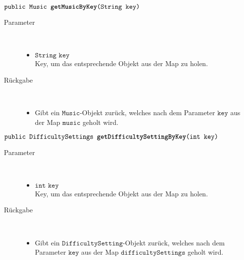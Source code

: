 \begin{description}
		\item $\texttt{public Music \textbf{getMusicByKey}(String key)}$ \\ 
		\begin{description}
			\item[Parameter] \hfill \\
			\vspace{-.8cm}
			\begin{itemize}
				\item $\texttt{String key}$ \\ Key, um das entsprechende Objekt aus der Map zu holen.
			\end{itemize}
			\item[Rückgabe] \hfill \\
			\vspace{-.8cm}
			\begin{itemize}
				\item Gibt ein $\texttt{Music}$-Objekt zurück, welches nach dem Parameter $\texttt{key}$ aus der Map $\texttt{music}$ geholt wird.
			\end{itemize}
			\end{description}

		\item $\texttt{public DifficultySettings \textbf{getDifficultySettingByKey}(int key)}$ \\ 
		\begin{description}
			\item[Parameter] \hfill \\
			\vspace{-.8cm}
			\begin{itemize}
				\item $\texttt{int key}$ \\ Key, um das entsprechende Objekt aus der Map zu holen.
			\end{itemize}
			\item[Rückgabe] \hfill \\
			\vspace{-.8cm}
			\begin{itemize}
				\item Gibt ein $\texttt{DifficultySetting}$-Objekt zurück, welches nach dem Parameter $\texttt{key}$ aus der Map $\texttt{difficultySettings}$ geholt wird.
			\end{itemize}
			\end{description}
			

\end{description}
